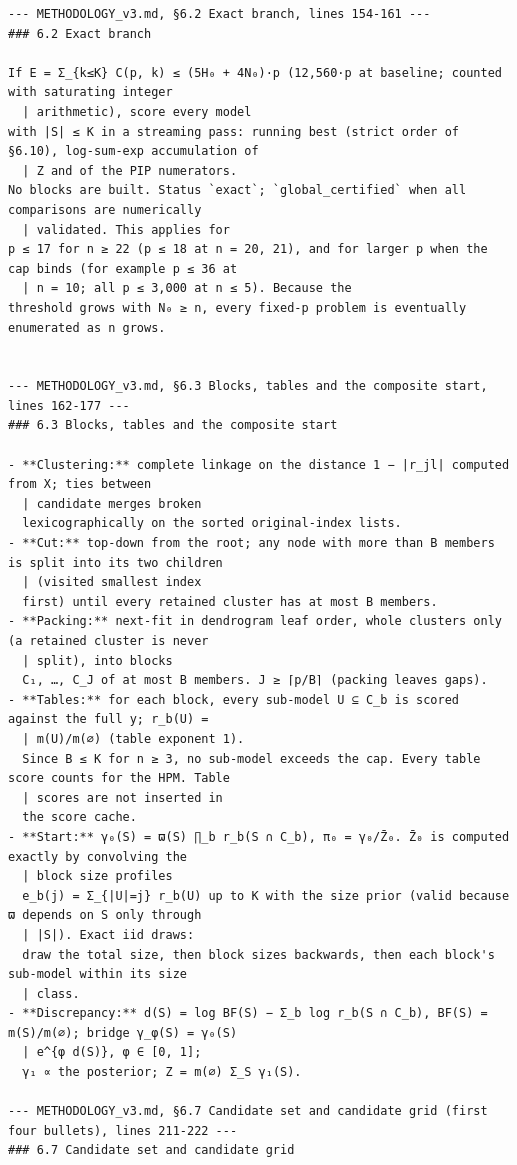 \documentclass[11pt]{article}
\theoremstyle{remark}
\begin{document}
\begin{Verbatim}[fontsize=\footnotesize,formatcom=\qfont]
--- METHODOLOGY_v3.md, §6.2 Exact branch, lines 154-161 ---
### 6.2 Exact branch

If E = Σ_{k≤K} C(p, k) ≤ (5H₀ + 4N₀)·p (12,560·p at baseline; counted with saturating integer
  | arithmetic), score every model
with |S| ≤ K in a streaming pass: running best (strict order of §6.10), log-sum-exp accumulation of
  | Z and of the PIP numerators.
No blocks are built. Status `exact`; `global_certified` when all comparisons are numerically
  | validated. This applies for
p ≤ 17 for n ≥ 22 (p ≤ 18 at n = 20, 21), and for larger p when the cap binds (for example p ≤ 36 at
  | n = 10; all p ≤ 3,000 at n ≤ 5). Because the
threshold grows with N₀ ≥ n, every fixed-p problem is eventually enumerated as n grows.


--- METHODOLOGY_v3.md, §6.3 Blocks, tables and the composite start, lines 162-177 ---
### 6.3 Blocks, tables and the composite start

- **Clustering:** complete linkage on the distance 1 − |r_jl| computed from X; ties between
  | candidate merges broken
  lexicographically on the sorted original-index lists.
- **Cut:** top-down from the root; any node with more than B members is split into its two children
  | (visited smallest index
  first) until every retained cluster has at most B members.
- **Packing:** next-fit in dendrogram leaf order, whole clusters only (a retained cluster is never
  | split), into blocks
  C₁, …, C_J of at most B members. J ≥ ⌈p/B⌉ (packing leaves gaps).
- **Tables:** for each block, every sub-model U ⊆ C_b is scored against the full y; r_b(U) =
  | m(U)/m(∅) (table exponent 1).
  Since B ≤ K for n ≥ 3, no sub-model exceeds the cap. Every table score counts for the HPM. Table
  | scores are not inserted in
  the score cache.
- **Start:** γ₀(S) = ϖ(S) ∏_b r_b(S ∩ C_b), π₀ = γ₀/Z̄₀. Z̄₀ is computed exactly by convolving the
  | block size profiles
  e_b(j) = Σ_{|U|=j} r_b(U) up to K with the size prior (valid because ϖ depends on S only through
  | |S|). Exact iid draws:
  draw the total size, then block sizes backwards, then each block's sub-model within its size
  | class.
- **Discrepancy:** d(S) = log BF(S) − Σ_b log r_b(S ∩ C_b), BF(S) = m(S)/m(∅); bridge γ_φ(S) = γ₀(S)
  | e^{φ d(S)}, φ ∈ [0, 1];
  γ₁ ∝ the posterior; Z = m(∅) Σ_S γ₁(S).

--- METHODOLOGY_v3.md, §6.7 Candidate set and candidate grid (first four bullets), lines 211-222 ---
### 6.7 Candidate set and candidate grid


\end{Verbatim}
\end{document}
